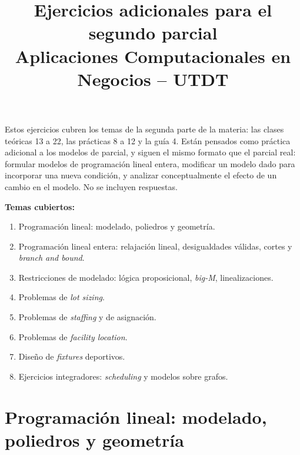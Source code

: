 \documentclass[11pt,a4paper]{article}
\title{\textbf{Ejercicios adicionales para el segundo parcial}\\[0.3em]
\large Aplicaciones Computacionales en Negocios -- UTDT}
\author{}
\date{}
\begin{document}
\maketitle
\thispagestyle{fancy}

\noindent
Estos ejercicios cubren los temas de la segunda parte de la materia: las clases
teóricas 13 a 22, las prácticas 8 a 12 y la guía 4. Están pensados como práctica
adicional a los modelos de parcial, y siguen el mismo formato que el parcial
real: formular modelos de programación lineal entera, modificar un modelo dado
para incorporar una nueva condición, y analizar conceptualmente el efecto de un
cambio en el modelo. No se incluyen respuestas.

\medskip
\noindent\textbf{Temas cubiertos:}
\begin{enumerate}[label=\arabic*.,leftmargin=2em,itemsep=1pt]
  \item Programación lineal: modelado, poliedros y geometría.
  \item Programación lineal entera: relajación lineal, desigualdades válidas,
  cortes y \emph{branch and bound}.
  \item Restricciones de modelado: lógica proposicional, \emph{big-M},
  linealizaciones.
  \item Problemas de \emph{lot sizing}.
  \item Problemas de \emph{staffing} y de asignación.
  \item Problemas de \emph{facility location}.
  \item Diseño de \emph{fixtures} deportivos.
  \item Ejercicios integradores: \emph{scheduling} y modelos sobre grafos.
\end{enumerate}

\section{Programación lineal: modelado, poliedros y geometría}
\end{document}
